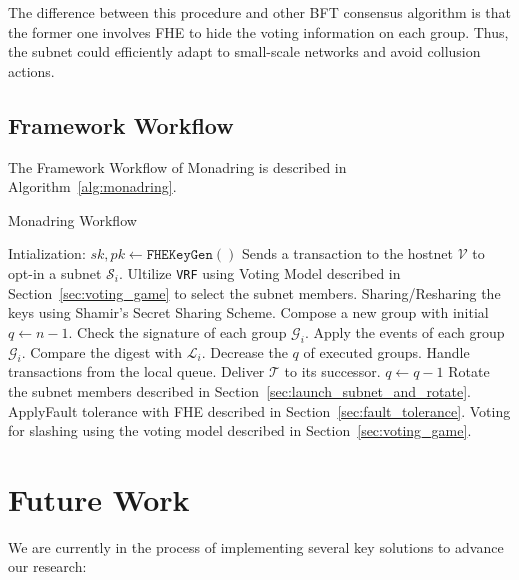 \documentclass[11pt]{article}
\begin{document}
The difference between this procedure and other BFT consensus algorithm is that the former one involves FHE to hide the voting information on each group.
Thus, the subnet could efficiently adapt to small-scale networks and avoid collusion actions.



\subsection{Framework Workflow}
\label{sec:framework_workflow}
The Framework Workflow of Monadring is described in Algorithm~\ref{alg:monadring}.
\begin{algorithm}[h!]
	\caption{Monadring Workflow}
  \label{alg:monadring}
	\begin{algorithmic}[1]
		\State Intialization: $sk, pk \leftarrow \texttt{FHEKeyGen}()$
    \State Sends a transaction to the hostnet $\mathcal{V}$ to opt-in a subnet $\mathcal{S}_i$.
    \State Ultilize \texttt{VRF} using Voting Model described in Section~\ref{sec:voting_game} to select the subnet members.
      \State Sharing/Resharing the keys using Shamir's Secret Sharing Scheme.
      \State Compose a new group with initial $q\leftarrow n-1$.
          \State Check the signature of each group $\mathcal{G}_i$.
          \State Apply the events of each group $\mathcal{G}_i$.
          \State Compare the digest with $\mathcal{L}_i$.
          \State Decrease the $q$ of executed groups.
          \State Handle transactions from the local queue.
          \State Deliver $\mathcal{T}$ to its successor.
        \EndIf
          \State $q \leftarrow q - 1$
      \EndWhile
      \State Rotate the subnet members described in Section~\ref{sec:launch_subnet_and_rotate}.
        \State ApplyFault tolerance with FHE described in Section~\ref{sec:fault_tolerance}.
        \State Voting for slashing using the voting model described in Section~\ref{sec:voting_game}.
      \EndIf
		\EndFor
	\end{algorithmic}
  \end{algorithm}
\section{Future Work}
We are currently in the process of implementing several key solutions to advance our research:
\end{document}

